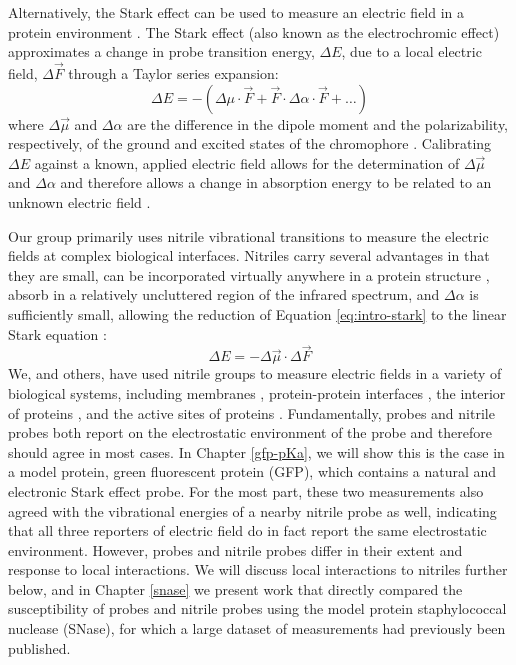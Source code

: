 Alternatively, the Stark effect can be used to measure an electric field in a protein environment \cite{Slocum2018, Fried2015, Blasiak2017}. 
The Stark effect (also known as the electrochromic effect) approximates a change in probe transition energy, $\Delta E$, due to a local electric field, $\Delta \vec{F}$ through a Taylor series expansion:
\begin{equation}
    \Delta E = -(\Delta \mu \cdot \vec{F} + \vec{F} \cdot \Delta \alpha \cdot \vec{F} + \ldots)
    \label{eq:intro-stark}
\end{equation}
where $\Delta \vec{\mu}$ and $\Delta \alpha$ are the difference in the dipole moment and the polarizability, respectively, of the ground and excited states of the chromophore \cite{Stark1913, Boxer2009, Slocum2018}. 
Calibrating $\Delta E$ against a known, applied electric field allows for the determination of $\Delta \vec{\mu}$ and $\Delta \alpha$ and therefore allows a change in absorption energy to be related to an unknown electric field \cite{Boxer2009,Fried2015}. 

Our group primarily uses nitrile vibrational transitions to measure the electric fields at complex biological interfaces. 
Nitriles carry several advantages in that they are small, can be incorporated virtually anywhere in a protein structure \cite{Fafarman2006, Getahun2003, Kirshenbaum2002}, absorb in a relatively uncluttered region of the infrared spectrum, and $\Delta \alpha$ is sufficiently small, allowing the reduction of Equation \ref{eq:intro-stark} to the linear Stark equation \cite{Webb2008}: 
\begin{equation} 
    \Delta E = - \Delta \vec{\mu} \cdot \Delta \vec{F}
    \label{eq:intro-vse}
\end{equation}
We, and others, have used nitrile groups to measure electric fields in a variety of biological systems, including membranes \cite{Shrestha2015, Shrestha2017}, protein-protein interfaces \cite{Stafford2010, Stafford2012, Novelli2018}, the interior of proteins \cite{Slocum2016, Slocum2017, First2018}, and the active sites of proteins \cite{Webb2008, Fafarman2012}. 
Fundamentally, \pKa{} probes and nitrile probes both report on the electrostatic environment of the probe and therefore should agree in most cases. 
In Chapter \ref{gfp-pKa}, we will show this is the case in a model protein, green fluorescent protein (GFP), which contains a natural \pKa{} and electronic Stark effect probe. 
For the most part, these two measurements also agreed with the vibrational energies of a nearby nitrile probe as well, indicating that all three reporters of electric field do in fact report the same electrostatic environment. 
However, \pKa{} probes and nitrile probes differ in their extent and response to local interactions. 
We will discuss local interactions to nitriles further below, and in Chapter \ref{snase} we present work that directly compared the susceptibility of \pKa{} probes and nitrile probes using the model protein staphylococcal nuclease (SNase), for which a large dataset of \pKa{} measurements had previously been published. 

